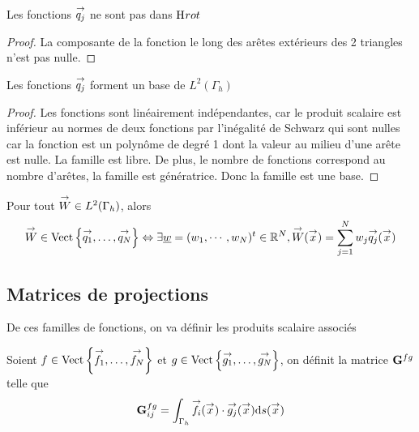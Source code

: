       \begin{prop}
        Les fonctions \({\overset{\rightarrow}{q_j}}\) ne sont pas dans \(\mathrm{H}_\mathrm{{}}{rot}\)
      \end{prop}
      \begin{proof}
        La composante de la fonction le long des arêtes extérieurs des 2 triangles n'est pas nulle.
      \end{proof}

      \begin{prop}
        Les fonctions \({\overset{\rightarrow}{q_j}}\) forment un base de \(L^2(\Gamma_h)\)
      \end{prop}
      \begin{proof}

        Les fonctions sont linéairement indépendantes, car le produit scalaire est inférieur au normes de deux fonctions par l'inégalité de Schwarz qui sont nulles car la fonction est un polynôme de degré 1 dont la valeur au milieu d'une arête est nulle. La famille est libre.
        De plus, le nombre de fonctions correspond au nombre d'arêtes, la famille est génératrice. Donc la famille est une base.
      \end{proof}

      \begin{defn}
        Pour tout \({\overset{\rightarrow}{W}} \in L^2(\Gamma_h)\), alors
        \begin{equation*}
          {\overset{\rightarrow}{W}} \in \operatorname{Vect}\left\lbrace{\overset{\rightarrow}{q_1}},\ldots,{\overset{\rightarrow}{q_N}}\right\rbrace \Leftrightarrow \exists {\underline{w}} = (w_1,\cdots,w_N)^t \in \mathbb R^N, {\overset{\rightarrow}{W}}({\overset{\rightarrow}{x}}) = \sum_{j=1}^N w_j {\overset{\rightarrow}{q_j}}({\overset{\rightarrow}{x}})
        \end{equation*}
      \end{defn}


  \subsection{Matrices de projections}

    De ces familles de fonctions, on va définir les produits scalaire associés

    \begin{defn}
      Soient \(f \in \operatorname{Vect}\left\lbrace{\overset{\rightarrow}{f_1}},\ldots,{\overset{\rightarrow}{f_N}}\right\rbrace\) et \(g \in \operatorname{Vect}\left\lbrace{\overset{\rightarrow}{g_1}},\ldots,{\overset{\rightarrow}{g_N}}\right\rbrace\), on définit la matrice \(\mathbf{G}^{fg}\) telle que
      \begin{equation*}
        \mathbf{G}^{fg}_{ij} = \int_{\Gamma_h} {\overset{\rightarrow}{f_i}}({\overset{\rightarrow}{x}})\cdot {\overset{\rightarrow}{g_j}}({\overset{\rightarrow}{x}}) \mathrm{d}{s}({\overset{\rightarrow}{x}})
      \end{equation*}
    \end{defn}

